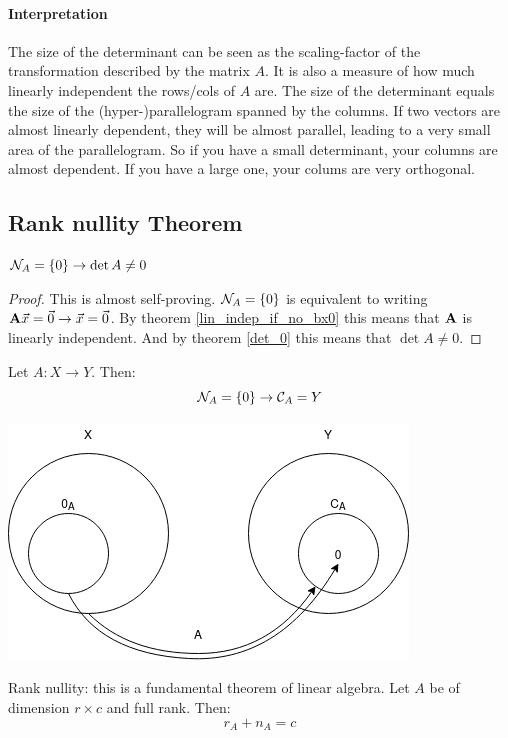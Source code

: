 \paragraph{Interpretation} The size of the determinant can be seen as the scaling-factor of the transformation described by the matrix $A$.
It is also a measure of how much linearly independent the rows/cols of $A$ are. The size of the determinant equals the size of the (hyper-)parallelogram spanned by the columns. If two vectors are almost linearly dependent, they will be almost parallel, leading to a very small area of the parallelogram. So if you have a small determinant, your columns are almost dependent. If you have a large one, your colums are very orthogonal. 












\subsection{Rank nullity Theorem}


\begin{theorem}
    $ \mathcal{N}_{A} = \{ 0 \} \to \det{A} \neq 0 $
\end{theorem}
\begin{proof}
    This is almost self-proving. 
    $\mathcal{N}_{A} = \{ 0 \}$ is equivalent to writing $\mathbf{A} \vec{x} = \vec{0} \to \vec{x} = \vec{0}$.
    By theorem \ref{lin_indep_if_no_bx0} this means that $\mathbf{A}$ is linearly independent.
    And by theorem \ref{det_0} this means that $ \det{A} \neq 0 $.
\end{proof}


\begin{theorem}
    Let $A: X \to Y$. Then:
    $$ \mathcal{N}_{A} = \{ 0 \} \to \mathcal{C}_{A} = Y $$
\end{theorem}

\includegraphics[width=0.4\linewidth]{images/A_from_X_to_Y.png}

\begin{theorem}
    Rank nullity: this is a fundamental theorem of linear algebra.
    Let $A$ be of dimension $r \times c$ and full rank.
    Then: 
    $$ r_A + n_A = c $$
\end{theorem}


